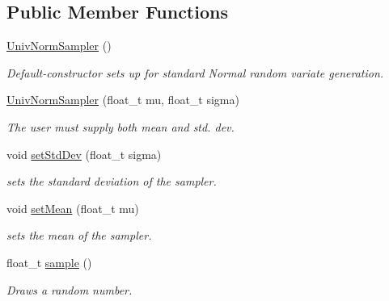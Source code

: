 \subsection*{Public Member Functions}
\begin{DoxyCompactItemize}
\item 
\mbox{\label{classrvsamp_1_1UnivNormSampler_ade55cded90f94c26d4dfc309cf894a37}} 
\hyperlink{classrvsamp_1_1UnivNormSampler_ade55cded90f94c26d4dfc309cf894a37}{Univ\+Norm\+Sampler} ()
\begin{DoxyCompactList}\small\item\em Default-\/constructor sets up for standard Normal random variate generation. \end{DoxyCompactList}\item 
\hyperlink{classrvsamp_1_1UnivNormSampler_a9a643fec11776028014be75163819807}{Univ\+Norm\+Sampler} (float\+\_\+t mu, float\+\_\+t sigma)
\begin{DoxyCompactList}\small\item\em The user must supply both mean and std. dev. \end{DoxyCompactList}\item 
void \hyperlink{classrvsamp_1_1UnivNormSampler_a251f76fd8e9aa078d16bc01e53406681}{set\+Std\+Dev} (float\+\_\+t sigma)
\begin{DoxyCompactList}\small\item\em sets the standard deviation of the sampler. \end{DoxyCompactList}\item 
void \hyperlink{classrvsamp_1_1UnivNormSampler_a3969ca7da7cbea29ba766b3a87713049}{set\+Mean} (float\+\_\+t mu)
\begin{DoxyCompactList}\small\item\em sets the mean of the sampler. \end{DoxyCompactList}\item 
float\+\_\+t \hyperlink{classrvsamp_1_1UnivNormSampler_a67416efdbb1569a068d5a5a4914e27a1}{sample} ()
\begin{DoxyCompactList}\small\item\em Draws a random number. \end{DoxyCompactList}\end{DoxyCompactItemize}
